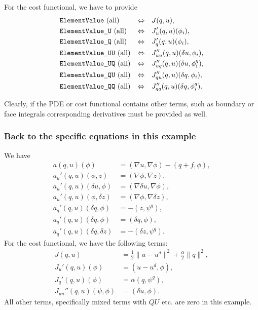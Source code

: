 For the cost functional, we have to provide{
\begin{align*}
&\texttt{ElementValue}\text{ (all)}   &\Leftrightarrow &\quad J(q,u), \\
&\texttt{ElementValue\underline{ }U}\text{ (all)}    &\Leftrightarrow &\quad J_u'(q,u)(\phi_i), \\
&\texttt{ElementValue\underline{ }Q}\text{ (all)}    &\Leftrightarrow &\quad J_q'(q,u)(\phi_i), \\
&\texttt{ElementValue\underline{ }UU}\text{ (all)}  &\Leftrightarrow &\quad J_{uu}''(q,u)(\delta u, \phi_i), \\
&\texttt{ElementValue\underline{ }UQ}\text{ (all)}  &\Leftrightarrow &\quad J_{uq}''(q,u)(\delta u, \phi^q_i), \\
&\texttt{ElementValue\underline{ }QU}\text{ (all)}   &\Leftrightarrow &\quad J_{qu}''(q,u)(\delta q, \phi_i), \\
&\texttt{ElementValue\underline{ }QQ}\text{ (all)}  &\Leftrightarrow &\quad J_{qq}''(q,u)(\delta q, \phi^q_i).
\end{align*}}

Clearly, if the PDE or cost functional contains other terms, such as boundary or face integrals 
corresponding derivatives must be provided as well.

\subsubsection{Back to the specific equations in this example}
We have
\begin{align*}
a(q,u)(\phi) &= (\nabla u, \nabla\phi) - (q + f, \phi),\\
a_u'(q,u)(\phi, z) &= (\nabla\phi, \nabla z),\\
a_u'(q,u)(\delta u, \phi) &= (\nabla\delta u, \nabla\phi),\\
a_u'(q,u)(\phi, \delta z) &= (\nabla\phi, \nabla\delta z),\\
a_q'(q,u)(\delta q, \phi) &= -(z,\psi^q),\\
a_q'(q,u)(\delta q, \phi) &= (\delta q,\phi),\\
a_{q}'(q,u)(\delta q,\delta z) &= - (\delta z,\psi^q).
\end{align*}
%
For the cost functional, we have the following terms:
\begin{align*}
J(q,u) &= \frac{1}{2} \|u-u^d\|^2 + \frac{\alpha}{2}\|q\|^2,\\
J_u'(q,u)(\phi) &= (u-u^d, \phi),\\
J_q'(q,u)(\phi) &= \alpha (q,\psi^q),\\
J_{uu}''(q,u)(\psi, \phi) &= (\delta u, \phi).
\end{align*}
All other terms, specifically mixed terms with $QU$ etc. are zero in this
example. 

